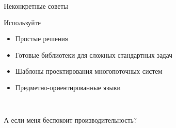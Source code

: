 \begin{frame}[t]{Неконкретные советы}

Используйте
\begin{itemize}
  \item Простые решения

  \pause
  \item Готовые библиотеки для сложных стандартных задач

  \pause
  \item Шаблоны проектирования многопоточных систем

  \pause
  \item Предметно-ориентированные языки
\end{itemize}

\pause
\
\
\
\
\
\

А если меня беспокоит производительность?


\end{frame}
 